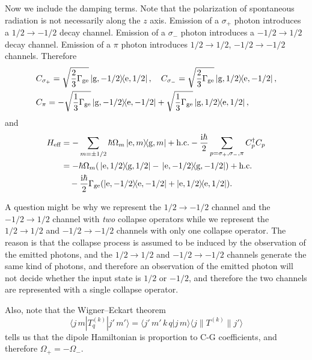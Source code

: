 \documentclass[hyperref, a4paper]{article}
\newcommand*{\ii}{\mathrm{i}}
\begin{document}
\begin{itemize}
Now we include the damping terms. Note that the polarization of spontaneous radiation is not necessarily 
along the $z$ axis. Emission of a $\sigma_+$ photon introduces a $1/2 \to -1/2$ decay channel. Emission of 
a $\sigma_-$ photon introduces a $-1/2 \to 1/2$ decay channel. Emission of a $\pi$ photon introduces
$1/2 \to 1/2$, $-1/2 \to -1/2$ channels. Therefore 
\begin{equation}
    \begin{aligned}
        &C_{\sigma_+} = \sqrt{\frac{2}{3} \Gamma_\text{ge}} \dyad*{\text{g}, -1/2}{\text{e}, 1/2} , \quad 
        C_{\sigma_-} = \sqrt{\frac{2}{3} \Gamma_\text{ge}} \dyad*{\text{g}, 1/2}{\text{e}, -1/2} , \\
        &C_{\pi} = - \sqrt{\frac{1}{3} \Gamma_\text{ge}} \dyad*{\text{g}, -1/2}{\text{e}, -1/2}
        + \sqrt{\frac{1}{3} \Gamma_\text{ge}} \dyad*{\text{g}, 1/2}{\text{e}, 1/2},
    \end{aligned}
\end{equation}
and 
\begin{equation}
    \begin{aligned}
        H_\text{eff} &= - \sum_{m = \pm 1/2} \hbar \Omega_m \dyad*{\text{e}, m}{\text{g}, m} + \text{h.c.} - \frac{\ii \hbar}{2} \sum_{p = \sigma_+, \sigma_-, \pi} C^\dagger_p C_p \\
        &= - \hbar \Omega_m (\dyad*{\text{e}, 1/2}{\text{g}, 1/2} - \dyad*{\text{e}, -1/2}{\text{g}, -1/2}) + \text{h.c.} \\
        &\quad - \frac{\ii \hbar}{2} \Gamma_\text{ge} (\dyad{\text{e}, -1/2} + \dyad{\text{e}, 1/2}).
    \end{aligned}
\end{equation}

\begin{note*}{}{}
    A question might be why we represent the $1/2 \to - 1/2$ channel and the $- 1/2 \to 1/2$ channel with 
    \emph{two} collapse operators while we represent the $1/2 \to 1/2$ and $-1/2 \to -1/2$ channels with 
    only one collapse operator. The reason is that the collapse process is assumed to be induced by 
    the observation of the emitted photons, and the $1/2 \to 1/2$ and $-1/2 \to -1/2$ channels generate
    the same kind of photons, and therefore an observation of the emitted photon will not decide whether 
    the input state is $1/2$ or $-1/2$, and therefore the two channels are represented with a single 
    collapse operator.

    Also, note that the Wigner–Eckart theorem 
    \begin{equation}
        \langle j\,m|T_{q}^{(k)}|j'\,m'\rangle =\langle j'\,m'\,k\,q|j\,m\rangle \langle j\|T^{(k)}\|j'\rangle
    \end{equation}
    tells us that the dipole Hamiltonian is proportion to C-G coefficients, and therefore $\Omega_+ = - \Omega_-$.
\end{note*}


\end{itemize}
\end{document}

